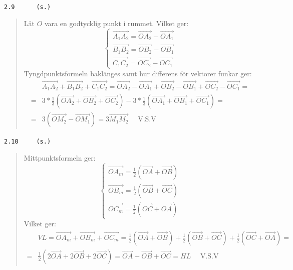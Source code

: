 \documentclass[a4paper]{article}
\newcommand{\tskcol}[1]{\textcolor{tskcol}{#1}}
\newcommand{\vek}[1]{\overrightarrow{#1}}
\begin{document}
\texttt{\tskcol{2.9~~~~~ (s.)}}
\begin{quotation}
	\noindent
	Låt $O$ vara en godtycklig punkt i rummet. Vilket ger:
	\[\begin{cases}
	\vek{A_1A_2}=\vek{OA_2}-\vek{OA_1} \\
	\vek{B_1B_2}=\vek{OB_2}-\vek{OB_1} \\
	\vek{C_1C_2}=\vek{OC_2}-\vek{OC_1}
	\end{cases}\]
	Tyngdpunktsformeln baklänges samt hur differens för vektorer funkar ger:
	\begin{align*}
	&\vek{A_1A_2}+\vek{B_1B_2}+\vek{C_1C_2}=
	\vek{OA_2}-\vek{OA_1}+\vek{OB_2}-\vek{OB_1}+\vek{OC_2}-\vek{OC_1}= \\ =
	&3*\frac{1}{3}(\vek{OA_2}+\vek{OB_2}+\vek{OC_2})-3*\frac{1}{3}(\vek{OA_1}+\vek{OB_1}+\vek{OC_1})= \\ =
	&3(\vek{OM_2}-\vek{OM_1})=
	3\vek{M_1M_2} \text{~~~~V.S.V}
	\end{align*}
\end{quotation}

\texttt{\tskcol{2.10~~~~ (s.)}}
\begin{quotation}
	\noindent
	Mittpunktsformeln ger:
	\[\begin{cases}
	\vek{OA_m}=\frac{1}{2}(\vek{OA}+\vek{OB}) \\
	\vek{OB_m}=\frac{1}{2}(\vek{OB}+\vek{OC}) \\
	\vek{OC_m}=\frac{1}{2}(\vek{OC}+\vek{OA})
	\end{cases}\]
	Vilket ger:
	\begin{align*}
	&VL=\vek{OA_m}+\vek{OB_m}+\vek{OC_m}=
	\frac{1}{2}(\vek{OA}+\vek{OB})+\frac{1}{2}(\vek{OB}+\vek{OC})+\frac{1}{2}(\vek{OC}+\vek{OA})= \\ =
	&\frac{1}{2}(2\vek{OA}+2\vek{OB}+2\vek{OC})=
	\vek{OA}+\vek{OB}+\vek{OC}=HL \text{~~~~V.S.V}
	\end{align*}
\end{quotation}
\end{document}
